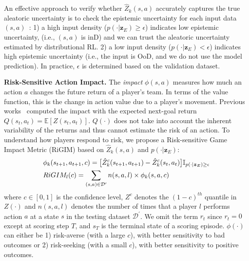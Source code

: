 \documentclass{article}
\newcommand{\condition}{\boldsymbol{z}_{E}}
\newcommand{\state}{s}
\newcommand{\action}{a}
\newcommand{\reward}{r}
\newcommand{\agentIndex}{k}
\newcommand{\dataset}{\mathcal{D}}
\newcommand{\expect}{\mathbb{E}}
\newcommand{\confidence}{c}
\newcommand{\impact}{\phi}
\newcommand{\playerId}{l}
\newcommand{\sys}{RiGIM}
\newcommand{\system}{\sys\;}
\begin{document}
An effective approach to verify whether $\hat{Z}_{\agentIndex}(\state,\action)$ accurately captures the true aleatoric uncertainty is to check the epistemic uncertainty for each input data $(\state,\action)$~\cite{Mukhoti2021Uncertainty}: 1) a high input density ($p(\cdot|\condition)\geq\epsilon$) indicates low epistemic uncertainty,
(i.e., $(\state,\action)$ is inD)
and we can trust the aleatoric uncertainty estimated by distributional RL. 2) a low input density ($p(\cdot|\condition)<\epsilon$) indicates high epistemic uncertainty (i.e., the input is OoD, and we do not use the model prediction). In practice, $\epsilon$ is determined based on the validation dataset.

\noindent\textbf{Risk-Sensitive Action Impact.}
The {\it impact} $\impact(\state,\action)$ measures how much an action $\action$ changes the future return of a player's team. In terms of the value function, this is the change in action value due to a player’s movement. 
Previous works~\cite{Routley2015Markov,Liu2018DRL,Decroos2019Actions} computed the impact with the expected next-goal return $Q(\state_{t},\action_{t})=\expect[Z(\state_{t},\action_{t})]$. $Q(\cdot)$ does not take into account the inherent variability of the returns and thus cannot estimate the risk of an action. 
To understand how players respond to risk, we propose a Risk-sensitive Game Impact Metric (\system) based on $\hat{Z}_{\agentIndex}(\state,\action)$ and $p(\cdot|\condition)$:
\begin{align}
    &\impact_{\agentIndex}(\state_{t+1},\action_{t+1},\confidence)=\big[\hat{Z}^{\confidence}_{\agentIndex}(\state_{t+1},\action_{t+1})-
    \hat{Z}^{\confidence}_{\agentIndex}(\state_{t},\action_{t})\big]\mathbb{I}_{p(\cdot|\condition)\geq\epsilon}
    \nonumber\\
    &\sys_{\playerId}(\confidence)=\sum_{(\state,\action)\in\dataset^{\prime}}n(\state,\action,\playerId)\times\impact_{\agentIndex}(\state,\action,\confidence)\label{eqn:RIGIM}
    \vspace{-0.1in}
\end{align}
where $\confidence\in[0,1]$ is the confidence level, $Z^{\confidence}$ denotes the $(1-\confidence)^{th}$ quantile in $Z(\cdot)$ and $n(\state,\action,\playerId)$ denotes the number of times that a player $\playerId$ performs action $\action$ at a state $\state$ in the testing dataset $\dataset^{\prime}$. We omit the term $\reward_t$ since $\reward_{t}=0$ except at scoring step $T$, and $\state_{T}$ is the terminal state of a scoring episode.
$\impact(\cdot)$ can either be 1) risk-averse (with a large $\confidence$), with better sensitivity to bad outcomes or 2) risk-seeking (with a small $\confidence$), with better sensitivity to positive outcomes.
\end{document}
